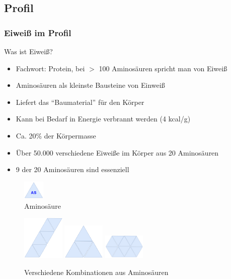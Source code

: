 \documentclass[xcolor=dvipsnames]{beamer}
\begin{document}
    \subsection{Profil}
    \begin{frame}[allowframebreaks]
        \frametitle{Eiweiß im Profil}

        \begin{block}{Was ist Eiweiß?}
            \begin{itemize}
                \setlength\itemsep{1em}
                \item Fachwort: Protein, bei $>$ 100 Aminosäuren spricht man von Eiweiß
                \item Aminosäuren als kleinste Bausteine von Einweiß
                \item Liefert das "`Baumaterial"' für den Körper
                \item Kann bei Bedarf in Energie verbrannt werden (4 kcal/g)
                \item Ca. 20\% der Körpermasse
                \item Über 50.000 verschiedene Eiweiße im Körper aus 20 Aminosäuren
                \item 9 der 20 Aminosäuren sind essenziell
            \end{itemize}
        \end{block}

        \framebreak

        \begin{figure}
            \centering
            \includegraphics[width=1cm]{../images/as.png}
            \caption{Aminosäure}
        \end{figure}

        \begin{figure}
            \centering
            \includegraphics[width=2cm]{../images/as1.png}
            \includegraphics[width=2cm]{../images/as2.png}
            \includegraphics[width=2cm]{../images/as3.png}
            \caption{Verschiedene Kombinationen aus Aminosäuren}
        \end{figure}
    \end{frame}
\end{document}
